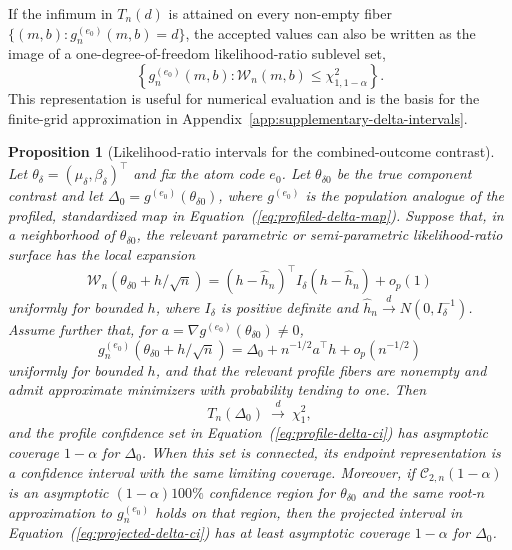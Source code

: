 \documentclass[11pt]{article}
\newtheorem{proposition}{Proposition}
\begin{document}
If the infimum in $T_n(d)$ is attained on every non-empty fiber $\{(m,b):g_n^{(e_0)}(m,b)=d\}$, the accepted values can also be written as the image of a one-degree-of-freedom likelihood-ratio sublevel set,
\[
  \left\{
    g_n^{(e_0)}(m,b):
    \mathcal{W}_n(m,b)\leq\chi^2_{1,1-\alpha}
  \right\}.
\]
This representation is useful for numerical evaluation and is the basis for the finite-grid approximation in Appendix~\ref{app:supplementary-delta-intervals}.

\begin{proposition}[Likelihood-ratio intervals for the combined-outcome contrast]\label{prop:delta-lr-intervals}
Let $\theta_\delta=(\mu_\delta,\beta_\delta)^\top$ and fix the atom code $e_0$. Let $\theta_{\delta0}$ be the true component contrast and let $\Delta_0=g^{(e_0)}(\theta_{\delta0})$, where $g^{(e_0)}$ is the population analogue of the profiled, standardized map in Equation~(\ref{eq:profiled-delta-map}). Suppose that, in a neighborhood of $\theta_{\delta0}$, the relevant parametric or semi-parametric likelihood-ratio surface has the local expansion
\[
  \mathcal W_n(\theta_{\delta0}+h/\sqrt n)
  =
  (h-\widehat h_n)^\top I_\delta(h-\widehat h_n)+o_p(1)
\]
uniformly for bounded $h$, where $I_\delta$ is positive definite and $\widehat h_n\overset{d}{\to}N(0,I_\delta^{-1})$. Assume further that, for $a=\nabla g^{(e_0)}(\theta_{\delta0})\neq0$,
\[
  g_n^{(e_0)}(\theta_{\delta0}+h/\sqrt n)
  =
  \Delta_0+n^{-1/2}a^\top h+o_p(n^{-1/2})
\]
uniformly for bounded $h$, and that the relevant profile fibers are nonempty and admit approximate minimizers with probability tending to one. Then
\[
  T_n(\Delta_0)\ \overset{d}{\longrightarrow}\ \chi^2_1,
\]
and the profile confidence set in Equation~(\ref{eq:profile-delta-ci}) has asymptotic coverage $1-\alpha$ for $\Delta_0$. When this set is connected, its endpoint representation is a confidence interval with the same limiting coverage. Moreover, if $\mathcal{C}_{2,n}(1-\alpha)$ is an asymptotic $(1-\alpha)100\%$ confidence region for $\theta_{\delta0}$ and the same root-$n$ approximation to $g_n^{(e_0)}$ holds on that region, then the projected interval in Equation~(\ref{eq:projected-delta-ci}) has at least asymptotic coverage $1-\alpha$ for $\Delta_0$.
\end{proposition}
\end{document}
